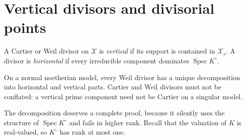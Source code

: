 \section{Vertical divisors and divisorial points}

\begin{definition}\label{def:vertical-horizontal-divisors}
A Cartier or Weil divisor on $\mathcal X$ is \emph{vertical} if its support
is contained in $\mathcal X_s$. A divisor is \emph{horizontal} if every
irreducible component dominates $\operatorname{Spec}K^\circ$.
\end{definition}

On a normal noetherian model, every Weil divisor has a unique decomposition
into horizontal and vertical parts. Cartier and Weil divisors must not be
conflated: a vertical prime component need not be Cartier on a singular
model.

The decomposition deserves a complete proof, because it silently uses the
structure of $\operatorname{Spec}K^\circ$ and fails in higher rank.  Recall
that the valuation of $K$ is real-valued, so $K^\circ$ has rank at most one.


